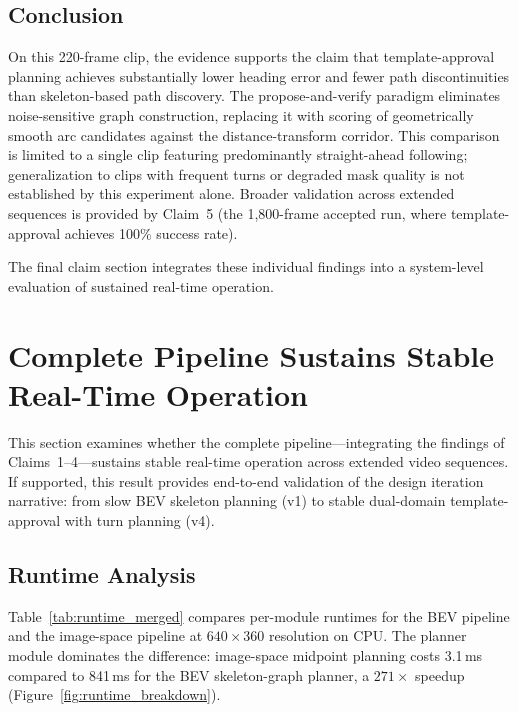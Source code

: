 \documentclass[12pt,letterpaper,oneside]{report}
\begin{document}
\subsection{Conclusion}

On this 220-frame clip, the evidence supports the claim that template-approval planning achieves substantially lower heading error and fewer path discontinuities than skeleton-based path discovery.  The propose-and-verify paradigm eliminates noise-sensitive graph construction, replacing it with scoring of geometrically smooth arc candidates against the distance-transform corridor.  This comparison is limited to a single clip featuring predominantly straight-ahead following; generalization to clips with frequent turns or degraded mask quality is not established by this experiment alone.  Broader validation across extended sequences is provided by Claim~5 (the 1,800-frame accepted run, where template-approval achieves 100\% success rate).

The final claim section integrates these individual findings into a system-level evaluation of sustained real-time operation.


\section{Complete Pipeline Sustains Stable Real-Time Operation}
\label{sec:claim_system_validation}

This section examines whether the complete pipeline---integrating the findings of Claims~1--4---sustains stable real-time operation across extended video sequences.  If supported, this result provides end-to-end validation of the design iteration narrative: from slow BEV skeleton planning (v1) to stable dual-domain template-approval with turn planning (v4).


\subsection{Runtime Analysis}

Table~\ref{tab:runtime_merged} compares per-module runtimes for the BEV pipeline and the image-space pipeline at $640\times360$ resolution on CPU.  The planner module dominates the difference: image-space midpoint planning costs 3.1\,ms compared to 841\,ms for the BEV skeleton-graph planner, a $271\times$ speedup (Figure~\ref{fig:runtime_breakdown}).
\end{document}
